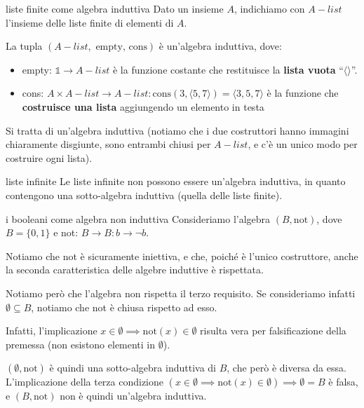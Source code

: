 \documentclass[a4paper,11pt]{report}
\begin{document}
\begin{gbox}{liste finite come algebra induttiva}
    Dato un insieme \( A \), indichiamo con \( A-list \) l'insieme delle liste finite di elementi di \( A \).

    La tupla \( (A-list,\text{ empty, cons}) \) è un'algebra induttiva, dove:
    \begin{itemize}
        \item empty: \( \mathbb{1} \to A-list \) è la funzione costante che restituisce la \textbf{lista vuota} ``\(\langle \rangle\)''.
        \item cons: \( A \times A-list \to A-list : \text{cons}(3, \langle 5, 7 \rangle) = \langle 3, 5, 7 \rangle \) è la funzione che \textbf{costruisce una lista} aggiungendo un elemento in testa
    \end{itemize}

    Si tratta di un'algebra induttiva (notiamo che i due costruttori hanno immagini chiaramente disgiunte, sono entrambi chiusi per \( A-list \), e c'è un unico modo per costruire ogni lista).

    \begin{gbox}[colframe=Mahogany]{liste infinite}
        Le liste infinite non possono essere un'algebra induttiva, in quanto contengono una sotto-algebra induttiva (quella delle liste finite).
    \end{gbox}
\end{gbox}

\begin{gbox}[colframe=Orchid]{i booleani come algebra non induttiva}
    Consideriamo l'algebra \( (B, \text{not}) \), dove \( B = \{0, 1\} \) e not: \(B \to B : b\to \neg b\).

    Notiamo che not è sicuramente iniettiva, e che, poiché è l'unico costruttore, anche la seconda caratteristica delle algebre induttive è rispettata.

    Notiamo però che l'algebra non rispetta il terzo requisito. Se consideriamo infatti \( \emptyset \subseteq B\), notiamo che not è chiusa rispetto ad esso. 

    Infatti, l'implicazione \( x \in \emptyset \implies \text{not}(x) \in \emptyset \) risulta vera per falsificazione della premessa (non esistono elementi in \( \emptyset \)).

    \( (\emptyset, \text{not}) \) è quindi una sotto-algebra induttiva di \( B \), che però è diversa da essa. L'implicazione della terza condizione \( (x \in \emptyset \implies \text{not}(x) \in \emptyset) \implies \emptyset = B \) è falsa, e \( (B, \text{not}) \) non è quindi un'algebra induttiva.
\end{gbox}
\end{document}

